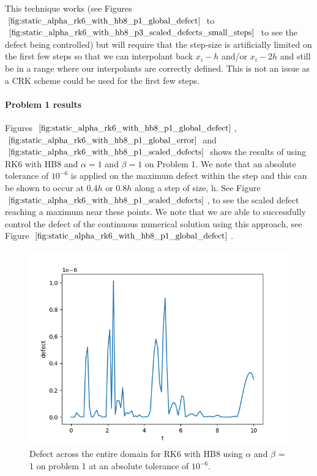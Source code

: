 This technique works (see Figures $\ref{fig:static_alpha_rk6_with_hb8_p1_global_defect}$ to $\ref{fig:static_alpha_rk6_with_hb8_p3_scaled_defects_small_steps}$ to see the defect being controlled) but will require that the step-size is artificially limited on the first few steps so that we can interpolant back $x_i - h$ and/or $x_i - 2h$ and still be in a range where our interpolants are correctly defined. This is not an issue as a CRK scheme could be used for the first few steps.

\paragraph{Problem 1 results}
Figures $\ref{fig:static_alpha_rk6_with_hb8_p1_global_defect}$, $\ref{fig:static_alpha_rk6_with_hb8_p1_global_error}$ and $\ref{fig:static_alpha_rk6_with_hb8_p1_scaled_defects}$ shows the results of using RK6 with HB8 and $\alpha = 1$ and $\beta = 1$ on Problem 1. We note that an absolute tolerance of $10^{-6}$ is applied on the maximum defect within the step and this can be shown to occur at $0.4h$ or $0.8h$ along a step of size, h. See Figure $\ref{fig:static_alpha_rk6_with_hb8_p1_scaled_defects}$, to see the scaled defect reaching a maximum near these points. We note that we are able to successfully control the defect of the continuous numerical solution using this approach, see Figure $\ref{fig:static_alpha_rk6_with_hb8_p1_global_defect}$. 
\begin{figure}[H]
\centering
\includegraphics[width=0.7\linewidth]{./figures/static_alpha_rk6_with_hb8_p1_global_defect}
\caption{Defect across the entire domain for RK6 with HB8 using $\alpha$ and $\beta$ = 1 on problem 1 at an absolute tolerance of $10^{-6}$.}
\label{fig:static_alpha_rk6_with_hb8_p1_global_defect}
\end{figure}

